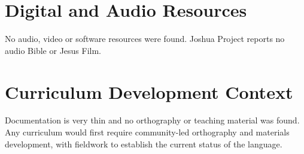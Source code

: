 \documentclass[12pt]{article}
\begin{document}
\section{Digital and Audio Resources}
No audio, video or software resources were found. Joshua Project reports no audio Bible or Jesus Film.

\section{Curriculum Development Context}
Documentation is very thin and no orthography or teaching material was found. Any curriculum would first require community-led orthography and materials development, with fieldwork to establish the current status of the language.
\end{document}

